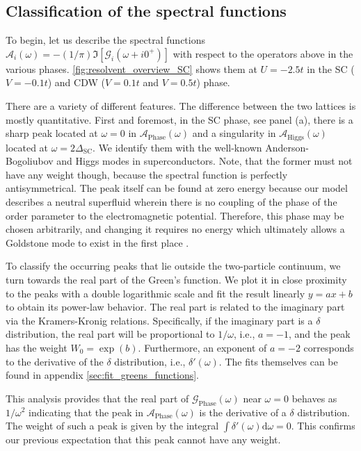 \documentclass[
    reprint, 
    aps,
    preprintnumbers,
    twocolumn,
    prb,
    superscriptaddress
]{revtex4-2}
\newcommand{\greens}[1]{\mathcal{G}_\text{#1} (\omega)}
\newcommand{\spectral}[1]{\mathcal{A}_\text{#1}  (\omega)}
\begin{document}
\subsection{Classification of the spectral functions}

To begin, let us describe the spectral functions $\mathcal{A}_i (\omega) = - (1/\pi) \Im [\mathcal{G}_i (\omega + i0^+)]$ with respect to the operators above in the various phases.
\autoref{fig:resolvent_overview_SC} shows them at $U = -2.5t$ in the SC ($V=-0.1t$) and CDW ($V=0.1t$ and $V=0.5t$) phase.

There are a variety of different features. The difference between the two lattices is mostly quantitative.
First and foremost, in the SC phase, see panel (a), 
there is a sharp peak located at $\omega=0$ in $\spectral{Phase}$ and a singularity in $\spectral{Higgs}$ located at $\omega=2\Delta_\text{SC}$.
We identify them with the well-known Anderson-Bogoliubov and Higgs modes in superconductors.
Note, that the former must not have any weight though, because the spectral function is perfectly antisymmetrical.
The peak itself can be found at zero energy because our model describes a neutral superfluid 
wherein there is no coupling of the phase of the order parameter to the electromagnetic potential.
Therefore, this phase may be chosen arbitrarily, and changing it requires no energy 
which ultimately allows a Goldstone mode to exist in the first place \cite{Goldstone1961,Anderson63}.

To classify the occurring peaks that lie outside the two-particle continuum, we turn towards the real part of the Green's function.
We plot it in close proximity to the peaks with a double logarithmic scale and fit the result linearly $y = ax + b$ to obtain its power-law behavior.
The real part is related to the imaginary part via the Kramers-Kronig relations.
Specifically, if the imaginary part is a $\delta$ distribution, the real part will be proportional to $1/\omega$, i.e., $a=-1$, and the peak has the weight $W_0 = \exp(b)$.
Furthermore, an exponent of $a=-2$ corresponds to the derivative of the $\delta$ distribution, i.e., $\delta'(\omega)$.
The fits themselves can be found in appendix \autoref{sec:fit_greens_functions}.

This analysis provides that the real part of $\greens{Phase}$ near $\omega=0$ behaves as $1/\omega^2$ indicating that the peak in $\spectral{Phase}$ is the derivative of a $\delta$ distribution.
The weight of such a peak is given by the integral $\int \delta'(\omega) \mathrm{d}\omega = 0$.
This confirms our previous expectation that this peak cannot have any weight.
\end{document}
